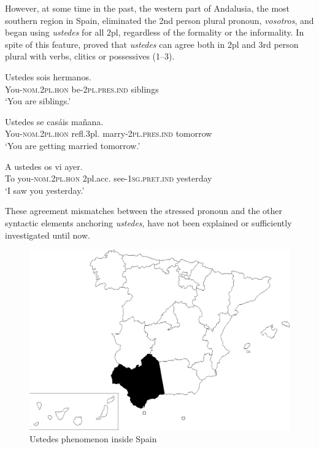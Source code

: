 \documentclass[output=paper]{LSP/langsci}
\begin{document}
However, at some time in the past, the western part of Andalusia, the most southern region in Spain, eliminated the 2nd person plural pronoun, \textit{vosotros}, and began using \textit{ustedes} for all 2pl, regardless of the formality or the informality. In spite of this feature, \citet{lara_uso_2010} proved that \textit{ustedes} can agree both in 2pl and 3rd person plural with verbs, clitics or possessives (1--3).

\ea
\gll Ustedes sois hermanos.\\
 You-\textsc{nom.2pl.hon} be-\textsc{2pl.pres.ind} siblings\\
\glt`You are siblings.'
\z

\ea
\gll Ustedes se casáis mañana.\\
 You-\textsc{nom.2pl.hon} refl.3pl. marry-\textsc{2pl.pres.ind} tomorrow\\
\glt ‘You are getting married tomorrow.’\\
\z

\ea
\gll A ustedes os vi ayer.\\
 To you-\textsc{nom.2pl.hon} 2pl.acc. see-\textsc{1sg.pret.ind}   yesterday\\
\glt ‘I saw you yesterday.’\\
\z

These agreement mismatches between the stressed pronoun and the other syntactic elements anchoring \textit{ustedes}, have not been explained or sufficiently investigated until now.

\begin{figure}
\includegraphics[width=\textwidth]{illustrations/lara_fig1}
\caption{Ustedes phenomenon inside Spain}
\label{fig1}
\end{figure}
\end{document}
